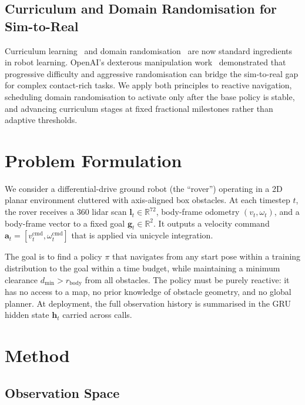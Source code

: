 \documentclass[letterpaper, 10pt, journal]{IEEEtran}
\begin{document}
\subsection{Curriculum and Domain Randomisation for Sim-to-Real}

Curriculum learning~\cite{bengio2009curriculum} and domain
randomisation~\cite{tobin2017domain} are now standard ingredients in robot learning.
OpenAI's dexterous manipulation work~\cite{openai2019dexterous} demonstrated that
progressive difficulty and aggressive randomisation can bridge the sim-to-real gap for
complex contact-rich tasks. We apply both principles to reactive navigation, scheduling
domain randomisation to activate only after the base policy is stable, and advancing
curriculum stages at fixed fractional milestones rather than adaptive thresholds.

\section{Problem Formulation}

We consider a differential-drive ground robot (the ``rover'') operating in a 2D
planar environment cluttered with axis-aligned box obstacles. At each timestep $t$,
the rover receives a 360\textdegree{} lidar scan $\mathbf{l}_t \in \mathbb{R}^{72}$,
body-frame odometry $(v_t, \omega_t)$, and a body-frame vector to a fixed goal
$\mathbf{g}_t \in \mathbb{R}^2$. It outputs a velocity command
$\mathbf{a}_t = [v^{\mathrm{cmd}}_t, \omega^{\mathrm{cmd}}_t]$ that is applied via
unicycle integration.

The goal is to find a policy $\pi$ that navigates from any start pose within a
training distribution to the goal within a time budget, while maintaining a minimum
clearance $d_{\min} > r_{\mathrm{body}}$ from all obstacles. The policy must be
purely reactive: it has no access to a map, no prior knowledge of obstacle geometry,
and no global planner. At deployment, the full observation history is summarised in
the GRU hidden state $\mathbf{h}_t$ carried across calls.

\section{Method}

\subsection{Observation Space}
\end{document}
